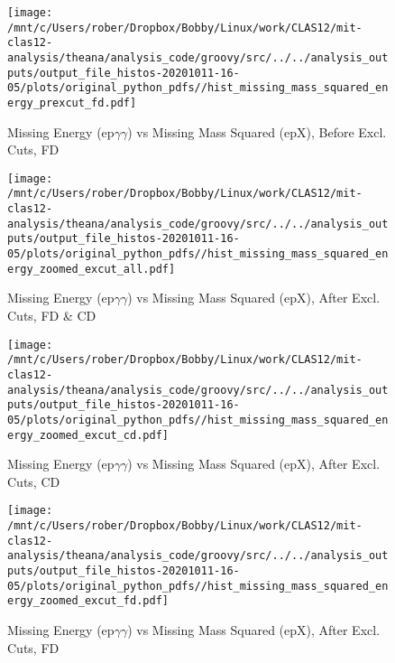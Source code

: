 \documentclass{article}
\begin{document}
\begin{landscape}
    \begin{figure}[h]
        \centering

        \texttt{[image: /mnt/c/Users/rober/Dropbox/Bobby/Linux/work/CLAS12/mit-clas12-analysis/theana/analysis\_code/groovy/src/../../analysis\_outputs/output\_file\_histos-20201011-16-05/plots/original\_python\_pdfs//hist\_missing\_mass\_squared\_energy\_prexcut\_fd.pdf]}
        \captionsetup{textformat=empty,labelformat=blank}
        \caption{Missing Energy (ep$\gamma$$\gamma$) vs Missing Mass Squared (epX), Before Excl. Cuts, FD}
    \end{figure}
    \clearpage
    
    \begin{figure}[h]
        \centering

        \texttt{[image: /mnt/c/Users/rober/Dropbox/Bobby/Linux/work/CLAS12/mit-clas12-analysis/theana/analysis\_code/groovy/src/../../analysis\_outputs/output\_file\_histos-20201011-16-05/plots/original\_python\_pdfs//hist\_missing\_mass\_squared\_energy\_zoomed\_excut\_all.pdf]}
        \captionsetup{textformat=empty,labelformat=blank}
        \caption{Missing Energy (ep$\gamma$$\gamma$) vs Missing Mass Squared (epX), After Excl. Cuts, FD \& CD}
    \end{figure}
    \clearpage
    
    \begin{figure}[h]
        \centering

        \texttt{[image: /mnt/c/Users/rober/Dropbox/Bobby/Linux/work/CLAS12/mit-clas12-analysis/theana/analysis\_code/groovy/src/../../analysis\_outputs/output\_file\_histos-20201011-16-05/plots/original\_python\_pdfs//hist\_missing\_mass\_squared\_energy\_zoomed\_excut\_cd.pdf]}
        \captionsetup{textformat=empty,labelformat=blank}
        \caption{Missing Energy (ep$\gamma$$\gamma$) vs Missing Mass Squared (epX), After Excl. Cuts, CD}
    \end{figure}
    \clearpage
    
    \begin{figure}[h]
        \centering

        \texttt{[image: /mnt/c/Users/rober/Dropbox/Bobby/Linux/work/CLAS12/mit-clas12-analysis/theana/analysis\_code/groovy/src/../../analysis\_outputs/output\_file\_histos-20201011-16-05/plots/original\_python\_pdfs//hist\_missing\_mass\_squared\_energy\_zoomed\_excut\_fd.pdf]}
        \captionsetup{textformat=empty,labelformat=blank}
        \caption{Missing Energy (ep$\gamma$$\gamma$) vs Missing Mass Squared (epX), After Excl. Cuts, FD}
    \end{figure}
    \clearpage
    

\end{landscape}
\end{document}
